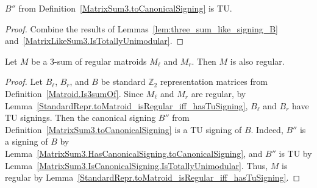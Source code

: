 \begin{lemma}
    \label{MatrixSum3.IsCanonicalSigning.IsTotallyUnimodular}
    \leanok
    $B''$ from Definition~\ref{MatrixSum3.toCanonicalSigning} is TU.
\end{lemma}

\begin{proof}
    \leanok
    Combine the results of Lemmas~\ref{lem:three_sum_like_signing_B} and~\ref{MatrixLikeSum3.IsTotallyUnimodular}.
\end{proof}

\begin{theorem}
    \label{Matroid.Is3sumOf.isRegular}
    \leanok
    Let $M$ be a $3$-sum of regular matroids $M_{\ell}$ and $M_{r}$. Then $M$ is also regular.
\end{theorem}

\begin{proof}
    \leanok
    Let $B_{\ell}$, $B_{r}$, and $B$ be standard $\mathbb{Z}_{2}$ representation matrices from Definition~\ref{Matroid.Is3sumOf}. Since $M_{\ell}$ and $M_{r}$ are regular, by Lemma~\ref{StandardRepr.toMatroid_isRegular_iff_hasTuSigning}, $B_{\ell}$ and $B_{r}$ have TU signings. Then the canonical signing $B''$ from Definition~\ref{MatrixSum3.toCanonicalSigning} is a TU signing of $B$. Indeed, $B''$ is a signing of $B$ by Lemma~\ref{MatrixSum3.HasCanonicalSigning.toCanonicalSigning}, and $B''$ is TU by Lemma~\ref{MatrixSum3.IsCanonicalSigning.IsTotallyUnimodular}. Thus, $M$ is regular by Lemma~\ref{StandardRepr.toMatroid_isRegular_iff_hasTuSigning}.
\end{proof}
